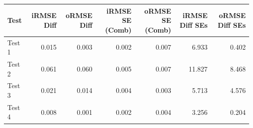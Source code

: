 
\begin{tabular}{l|r|r|r|r|r|r}
\hline
Test & iRMSE Diff & oRMSE Diff & iRMSE SE (Comb) & oRMSE SE (Comb) & iRMSE Diff SEs & oRMSE Diff SEs\\
\hline
Test 1 & 0.015 & 0.003 & 0.002 & 0.007 & 6.933 & 0.402\\
\hline
Test 2 & 0.061 & 0.060 & 0.005 & 0.007 & 11.827 & 8.468\\
\hline
Test 3 & 0.021 & 0.014 & 0.004 & 0.003 & 5.713 & 4.576\\
\hline
Test 4 & 0.008 & 0.001 & 0.002 & 0.004 & 3.256 & 0.204\\
\hline
\end{tabular}
